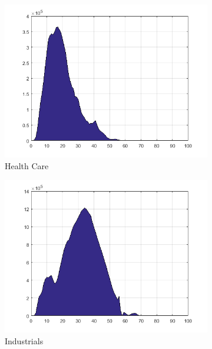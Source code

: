 \documentclass[11pt,a4,twosided,singlespacing,titlepagenumber=on]{scrreprt}
\numberwithin{equation}{chapter} %
\theoremstyle{remark}
\begin{document}
\begin{figure}[H]
\begin{subfigure}[t]{0.23\textwidth}
        \includegraphics[width=1\textwidth]{quad/5}
        \caption{Health Care}
    \end{subfigure}
    \begin{subfigure}[t]{0.23\textwidth}
        \centering
        \includegraphics[width=1\textwidth]{quad/6}
        \caption{Industrials}
    \end{subfigure}
    \begin{subfigure}[t]{0.23\textwidth}
        \centering

\end{subfigure}
\end{figure}
\end{document}
